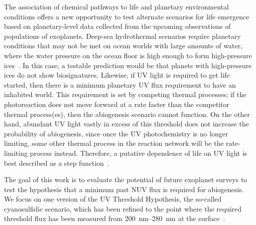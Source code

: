 \documentclass[twocolumn,twocolappendix,linenumbers]{aastex631}
\begin{document}
The association of chemical pathways to life and planetary environmental conditions offers a new opportunity to test alternate scenarios for life emergence based on planetary-level data collected from the upcoming observations of populations of exoplanets.
Deep-sea hydrothermal scenarios require planetary conditions that may not be met on ocean worlds with large amounts of water, where the water pressure on the ocean floor is high enough to form high-pressure ices~\citep{Noack2016,Kite2018}.  %
In this case, a testable prediction would be that planets with high-pressure ices do not show biosignatures.
Likewise, if \gls{UV} light is required to get life started, then there is a minimum planetary \gls{UV} flux requirement to have an inhabited world.
This requirement is set by competing thermal processes; if the photoreaction does not move forward at a rate faster than the competitor thermal process(es), then the abiogenesis scenario cannot function.
On the other hand, abundant \gls{UV} light vastly in excess of this threshold does not increase the probability of abiogenesis, since once the \gls{UV} photochemistry is no longer limiting, some other thermal process in the reaction network will be the rate-limiting process instead.
Therefore, a putative dependence of life on \gls{UV} light is best described as a step function~\citep[e.g.,][]{Ranjan2017c,Rimmer2018,Rimmer2021}.

The goal of this work is to evaluate the potential of future exoplanet surveys to test the hypothesis that a minimum past \gls{NUV} flux is required for abiogenesis.
We focus on one version of the UV Threshold Hypothesis, the so-called cyanosulfidic scenario, which has been refined to the point where the required threshold flux has been measured  from \SIrange{200}{280}{\nano\meter} at the surface~\citep{Rimmer2018,Rimmer2021a,Rimmer2023,Ranjan2023a}.
\end{document}
